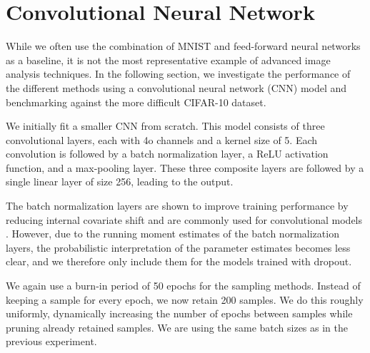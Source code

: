 \FloatBarrier
\section{Convolutional Neural Network}

While we often use the combination of MNIST and feed-forward neural networks as a baseline, it is not the most representative example of advanced image analysis techniques.
In the following section, we investigate the performance of the different methods using a convolutional neural network (CNN) model and benchmarking against the more difficult CIFAR-10 dataset.

We initially fit a smaller CNN from scratch.
This model consists of three convolutional layers, each with 4o channels and a kernel size of 5.
Each convolution is followed by a batch normalization layer, a ReLU activation function, and a max-pooling layer.
These three composite layers are followed by a single linear layer of size 256, leading to the output.

The batch normalization layers are shown to improve training performance by reducing internal covariate shift and are commonly used for convolutional models \cite{ioffe_batch_2015}. 
However, due to the running moment estimates of the batch normalization layers, the probabilistic interpretation of the parameter estimates becomes less clear, and we therefore only include them for the models trained with dropout. 

We again use a burn-in period of 50 epochs for the sampling methods.
Instead of keeping a sample for every epoch, we now retain 200 samples.
We do this roughly uniformly, dynamically increasing the number of epochs between samples while pruning already retained samples.
We are using the same batch sizes as in the previous experiment.

